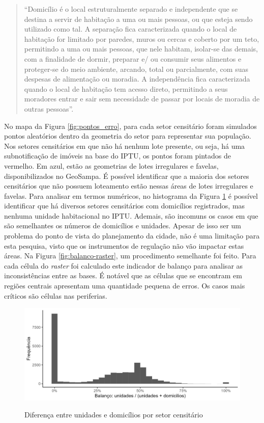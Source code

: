 \begin{quote}
    ``Domicílio é o local estruturalmente separado e independente que se destina a servir de habitação a uma ou mais pessoas, ou que esteja sendo utilizado como tal. A separação fica caracterizada quando o local de habitação for limitado por paredes, muros ou cercas e coberto por um teto, permitindo a uma ou mais pessoas, que nele habitam, isolar-se das demais, com a finalidade de dormir, preparar e/ ou consumir seus alimentos e proteger-se do meio ambiente, arcando, total ou parcialmente, com suas despesas de alimentação ou moradia. A independência fica caracterizada quando o local de habitação tem acesso direto, permitindo a seus moradores entrar e sair sem necessidade de passar por locais de moradia de outras pessoas''\cite{IBGE2013}.
\end{quote}

No mapa da Figura \ref{fig:pontos_erro}, para cada setor censitário foram simulados pontos aleatórios dentro da geometria do setor para representar sua população. Nos setores censitários em que não há nenhum lote presente, ou seja, há uma subnotificação de imóveis na base do IPTU, os pontos foram pintados de vermelho. Em azul, estão as geometrias de lotes irregulares e favelas, disponibilizados no GeoSampa. É possível identificar que a maioria dos setores censitários que não possuem loteamento estão nessas áreas de lotes irregulares e favelas. Para analisar em termos numéricos, no histograma da Figura \ref{fig:balanco} é possível identificar que há diversos setores censitários com domicílios registrados, mas nenhuma unidade habitacional no IPTU. Ademais, são incomuns os casos em que são semelhantes os números de domicílios e unidades. Apesar de isso ser um problema do ponto de vista do planejamento da cidade, não é uma limitação para esta pesquisa, visto que os instrumentos de regulação não vão impactar estas áreas. Na Figura \ref{fig:balanco-raster}, um procedimento semelhante foi feito. Para cada célula do \textit{raster} foi calculado este indicador de balanço para analisar as inconsistências entre as bases. É notável que as células que se encontram em regiões centrais apresentam uma quantidade pequena de erros. Os casos mais críticos são células nas periferias.

\begin{figure}[h]
    \centering
    \caption{Diferença entre unidades e domicílios por setor censitário}
    \includegraphics[width = \linewidth]{imagens/disparidade_censoIPTU.png}
    \label{fig:balanco}
\end{figure}

